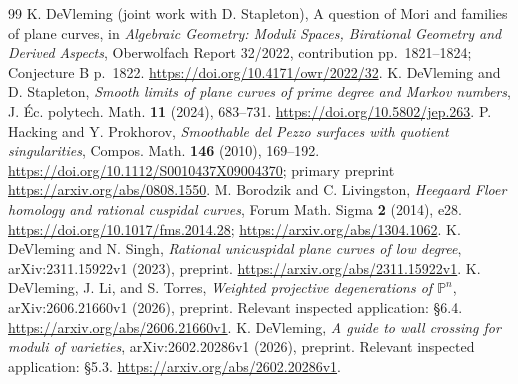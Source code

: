 \documentclass[11pt]{article}
\theoremstyle{remark}\newtheorem{remark}[theorem]{Remark}
\newcommand{\PP}{\mathbb P}\newcommand{\CC}{\mathbb C}\newcommand{\ZZ}{\mathbb Z}
\begin{document}
\begin{thebibliography}{99}
 K. DeVleming (joint work with D. Stapleton), A question of Mori and families of plane curves, in \emph{Algebraic Geometry: Moduli Spaces, Birational Geometry and Derived Aspects}, Oberwolfach Report 32/2022, contribution pp.~1821--1824; Conjecture B p.~1822. \url{https://doi.org/10.4171/owr/2022/32}.
 K. DeVleming and D. Stapleton, \emph{Smooth limits of plane curves of prime degree and Markov numbers}, J. \'{E}c. polytech. Math. \textbf{11} (2024), 683--731. \url{https://doi.org/10.5802/jep.263}.
 P. Hacking and Y. Prokhorov, \emph{Smoothable del Pezzo surfaces with quotient singularities}, Compos. Math. \textbf{146} (2010), 169--192. \url{https://doi.org/10.1112/S0010437X09004370}; primary preprint \url{https://arxiv.org/abs/0808.1550}.
 M. Borodzik and C. Livingston, \emph{Heegaard Floer homology and rational cuspidal curves}, Forum Math. Sigma \textbf{2} (2014), e28. \url{https://doi.org/10.1017/fms.2014.28}; \url{https://arxiv.org/abs/1304.1062}.
 K. DeVleming and N. Singh, \emph{Rational unicuspidal plane curves of low degree}, arXiv:2311.15922v1 (2023), preprint. \url{https://arxiv.org/abs/2311.15922v1}.
 K. DeVleming, J. Li, and S. Torres, \emph{Weighted projective degenerations of $\PP^n$}, arXiv:2606.21660v1 (2026), preprint. Relevant inspected application: \S6.4. \url{https://arxiv.org/abs/2606.21660v1}.
 K. DeVleming, \emph{A guide to wall crossing for moduli of varieties}, arXiv:2602.20286v1 (2026), preprint. Relevant inspected application: \S5.3. \url{https://arxiv.org/abs/2602.20286v1}.
\end{thebibliography}
\end{document}
